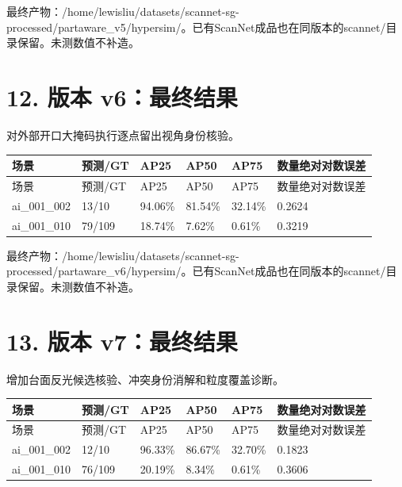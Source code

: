\documentclass[UTF8,fontset=fandol]{ctexart}
\begin{document}
最终产物：/home/lewisliu/datasets/scannet-sg-processed/partaware\_v5/hypersim/。已有ScanNet成品也在同版本的scannet/目录保留。未测数值不补造。



\section*{12. 版本 v6：最终结果}

对外部开口大掩码执行逐点留出视角身份核验。



{\small
\begin{longtable}{|p{}|p{}|p{}|p{}|p{}|p{}|}
\hline
场景 & 预测/GT & AP25 & AP50 & AP75 & 数量绝对对数误差 \\ \hline
\endfirsthead
\hline
场景 & 预测/GT & AP25 & AP50 & AP75 & 数量绝对对数误差 \\ \hline
\endhead
ai\_001\_002 & 13/10 & 94.06\% & 81.54\% & 32.14\% & 0.2624 \\ \hline
ai\_001\_010 & 79/109 & 18.74\% & 7.62\% & 0.61\% & 0.3219 \\ \hline
\end{longtable}
}

最终产物：/home/lewisliu/datasets/scannet-sg-processed/partaware\_v6/hypersim/。已有ScanNet成品也在同版本的scannet/目录保留。未测数值不补造。



\section*{13. 版本 v7：最终结果}

增加台面反光候选核验、冲突身份消解和粒度覆盖诊断。



{\small
\begin{longtable}{|p{}|p{}|p{}|p{}|p{}|p{}|}
\hline
场景 & 预测/GT & AP25 & AP50 & AP75 & 数量绝对对数误差 \\ \hline
\endfirsthead
\hline
场景 & 预测/GT & AP25 & AP50 & AP75 & 数量绝对对数误差 \\ \hline
\endhead
ai\_001\_002 & 12/10 & 96.33\% & 86.67\% & 32.70\% & 0.1823 \\ \hline
ai\_001\_010 & 76/109 & 20.19\% & 8.34\% & 0.61\% & 0.3606 \\ \hline
\end{longtable}
}
\end{document}
